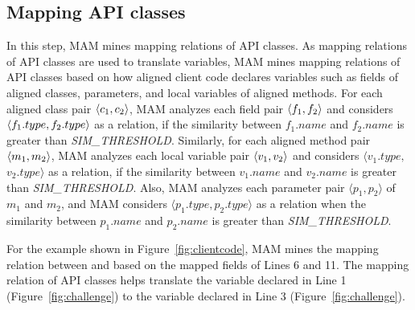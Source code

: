 \subsection{Mapping API classes}
\label{sec:approach:mappingtypes}

In this step, MAM mines mapping relations of
API classes. As mapping relations of API classes are used
to translate variables, MAM mines mapping
relations of API classes based on how aligned client code declares
variables such as fields of aligned classes, parameters, and local variables of aligned methods. For each aligned class pair $\langle c_1, c_2 \rangle$, MAM analyzes each field pair $\langle f_1, f_2 \rangle$ and considers
$\langle f_1.type, f_2.type \rangle$ as a relation, if the similarity between $f_1.name$ and $f_2.name$ is
greater than \emph{SIM\_THRESHOLD}. Similarly, for each aligned method pair
$\langle m_1, m_2 \rangle$, MAM analyzes each local variable pair
$\langle v_1, v_2 \rangle$ and considers $\langle v_1.type,$ $
v_2.type\rangle$ as a relation, if the similarity between
$v_1.name$ and $v_2.name$ is greater than
\emph{SIM\_THRESHOLD}. Also, MAM analyzes each parameter pair
$\langle p_1, p_2\rangle$ of $m_1$ and $m_2$, and MAM considers $\langle p_1.type, p_2.type\rangle$ as
a relation when the similarity between $p_1.name$ and $p_2.name$ is greater than \emph{SIM\_THRESHOLD}.

For the example shown in Figure~\ref{fig:clientcode}, MAM
mines the mapping relation between  and
 based on the mapped fields of Lines 6
and 11. The mapping relation of API
classes helps translate the variable declared in Line 1
(Figure~\ref{fig:challenge}) to the variable declared in Line 3
(Figure~\ref{fig:challenge}).


